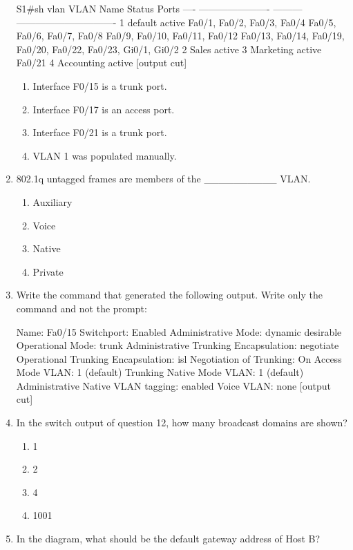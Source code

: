 \begin{enumerate}
\begin{cli}
S1#sh vlan
VLAN Name                    Status    Ports
---- ---------------------- --------- -------------------------------
1    default                 active    Fa0/1, Fa0/2, Fa0/3, Fa0/4
                                       Fa0/5, Fa0/6, Fa0/7, Fa0/8
                                       Fa0/9, Fa0/10, Fa0/11, Fa0/12
                                       Fa0/13, Fa0/14, Fa0/19, Fa0/20,
                                       Fa0/22, Fa0/23, Gi0/1, Gi0/2
2    Sales                   active
3    Marketing               active    Fa0/21
4    Accounting              active
[output cut]
\end{cli}

  \begin{enumerate}
    \item
    Interface F0/15 is a trunk port.
  \item
    Interface F0/17 is an access port.
  \item
    Interface F0/21 is a trunk port.
  \item
    VLAN 1 was populated manually.
  \end{enumerate}
\item
  802.1q untagged frames are members of the \_\_\_\_\_\_\_\_\_\_ VLAN.

  \begin{enumerate}
    \item
    Auxiliary
  \item
    Voice
  \item
    Native
  \item
    Private
  \end{enumerate}
\item
   Write the command
  that generated the following output. Write only the command and not
  the prompt:

\begin{cli}
Name: Fa0/15
Switchport: Enabled
Administrative Mode: dynamic desirable
Operational Mode: trunk
Administrative Trunking Encapsulation: negotiate
Operational Trunking Encapsulation: isl
Negotiation of Trunking: On
Access Mode VLAN: 1 (default)
Trunking Native Mode VLAN: 1 (default)
Administrative Native VLAN tagging: enabled
Voice VLAN: none
[output cut]
\end{cli}
\item
  In the switch output of question 12, how many broadcast domains are
  shown?

  \begin{enumerate}
    \item
    1
  \item
    2
  \item
    4
  \item
    1001
  \end{enumerate}
\item
  In the diagram, what should be the default gateway address of Host B?


\end{enumerate}
